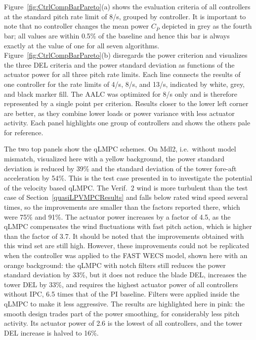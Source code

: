 Figure~\ref{fig:CtrlCompBarPareto}(a) shows the evaluation criteria of all controllers at the standard
pitch rate limit of 8\textdegree/s, grouped by controller. It is important to note that no controller changes the mean power
$C_{\bar{P}}$ depicted in grey as the fourth bar; all values are within 0.5\% of the baseline and hence this bar is always exactly at the value of one for all seven algorithms. Figure~\ref{fig:CtrlCompBarPareto}(b) disregards the power criterion and visualizes the three DEL criteria and the power standard deviation as functions of the actuator power for all three pitch rate limits. Each line connects the
results of one controller for the rate limits of 4\textdegree/s, 8\textdegree/s, and 13\textdegree/s,
indicated by white, grey, and black marker fill. The AALC was optimized for 8\textdegree/s only and
is therefore represented by a single point per criterion. Results closer to the lower left corner
are better, as they combine lower loads or power variance with less actuator activity. Each panel
highlights one group of controllers and shows the others pale for reference.

The two top panels show the qLMPC schemes. On Mdl2, i.e.\ without model mismatch, visualized here with a yellow background, the power
standard deviation is reduced by 39\% and the standard deviation of the tower fore-aft acceleration by
54\%. This is the test case presented in \cite{dittmer2021velocity} to investigate the potential of the velocity based qLMPC. The Verif.~2 wind is more turbulent than the test case of Section~\ref{quasiLPVMPCResults} and
falls below rated wind speed several times, so the improvements are smaller than the factors
reported there, which were 75\% and 91\%. The actuator power increases by a factor of 4.5, as the qLMPC compensates the
wind fluctuations with fast pitch action, which is higher than the factor of 3.7. It should be noted that the improvements obtained with this wind set are still high. However, these improvements could not be replicated when the controller was applied to the FAST WECS model, shown here with an orange background: the qLMPC with notch filters still reduces the
power standard deviation by 33\%, but it does not reduce the blade DEL, increases the tower DEL
by 33\%, and requires the highest actuator power of all controllers without IPC, 6.5 times that
of the PI baseline. Filters were applied inside the qLMPC to make it less aggressive. The results are highlighted here in pink: the smooth design trades part of the power smoothing, 
for considerably less pitch activity. Its actuator power of 2.6 is the lowest of all controllers,
and the tower DEL increase is halved to 16\%.


